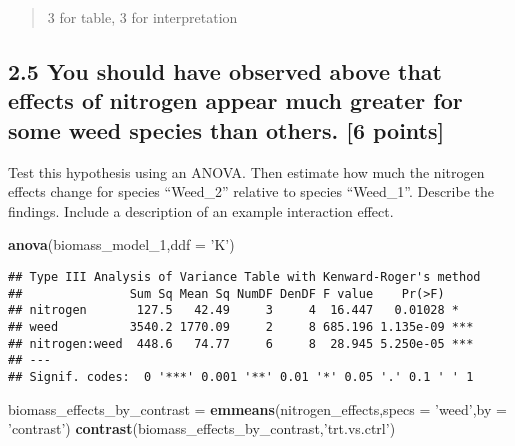 \documentclass[
]{article}
\newenvironment{Shaded}{\begin{snugshade}}{\end{snugshade}}
\newcommand{\DataTypeTok}[1]{\textcolor[rgb]{0.13,0.29,0.53}{#1}}
\newcommand{\DecValTok}[1]{\textcolor[rgb]{0.00,0.00,0.81}{#1}}
\newcommand{\KeywordTok}[1]{\textcolor[rgb]{0.13,0.29,0.53}{\textbf{#1}}}
\newcommand{\NormalTok}[1]{#1}
\newcommand{\StringTok}[1]{\textcolor[rgb]{0.31,0.60,0.02}{#1}}
\begin{document}
\begin{quote}
3 for table, 3 for interpretation
\end{quote}

\hypertarget{you-should-have-observed-above-that-effects-of-nitrogen-appear-much-greater-for-some-weed-species-than-others.-6-points}{%
\subsection{2.5 You should have observed above that effects of nitrogen
appear much greater for some weed species than others. {[}6
points{]}}\label{you-should-have-observed-above-that-effects-of-nitrogen-appear-much-greater-for-some-weed-species-than-others.-6-points}}

Test this hypothesis using an ANOVA. Then estimate how much the nitrogen
effects change for species ``Weed\_2'' relative to species ``Weed\_1''.
Describe the findings. Include a description of an example interaction
effect.

\begin{Shaded}
\begin{Highlighting}[]
\KeywordTok{anova}\NormalTok{(biomass_model_}\DecValTok{1}\NormalTok{,}\DataTypeTok{ddf =} \StringTok{'K'}\NormalTok{)}
\end{Highlighting}
\end{Shaded}

\begin{verbatim}
## Type III Analysis of Variance Table with Kenward-Roger's method
##               Sum Sq Mean Sq NumDF DenDF F value    Pr(>F)    
## nitrogen       127.5   42.49     3     4  16.447   0.01028 *  
## weed          3540.2 1770.09     2     8 685.196 1.135e-09 ***
## nitrogen:weed  448.6   74.77     6     8  28.945 5.250e-05 ***
## ---
## Signif. codes:  0 '***' 0.001 '**' 0.01 '*' 0.05 '.' 0.1 ' ' 1
\end{verbatim}

\begin{Shaded}
\begin{Highlighting}[]
\NormalTok{biomass_effects_by_contrast =}\StringTok{ }\KeywordTok{emmeans}\NormalTok{(nitrogen_effects,}\DataTypeTok{specs =} \StringTok{'weed'}\NormalTok{,}\DataTypeTok{by =} \StringTok{'contrast'}\NormalTok{)}
\KeywordTok{contrast}\NormalTok{(biomass_effects_by_contrast,}\StringTok{'trt.vs.ctrl'}\NormalTok{)}
\end{Highlighting}
\end{Shaded}
\end{document}
